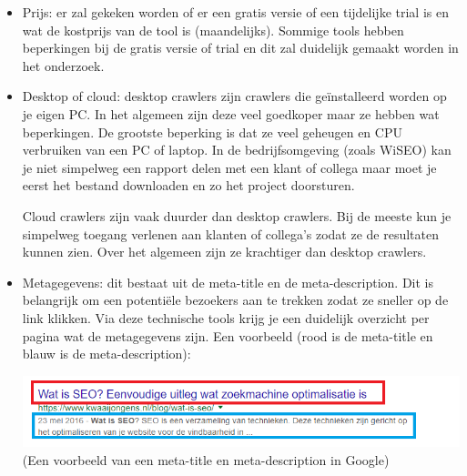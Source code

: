 \begin{itemize}
\item Prijs: er zal gekeken worden of er een gratis versie of een tijdelijke trial is en wat de kostprijs van de tool is (maandelijks). Sommige tools hebben beperkingen bij de gratis versie of trial en dit zal duidelijk gemaakt worden in het onderzoek. 
\item Desktop of cloud: 
desktop crawlers zijn crawlers die geïnstalleerd worden op je eigen PC. In het algemeen zijn deze veel goedkoper maar ze hebben wat beperkingen. De grootste beperking is dat ze veel geheugen en CPU verbruiken van een PC of laptop. In de bedrijfsomgeving (zoals WiSEO) kan je niet simpelweg een rapport delen met een klant of collega maar moet je eerst het bestand downloaden en zo het project doorsturen. 

Cloud crawlers zijn vaak duurder dan desktop crawlers. Bij de meeste kun je simpelweg toegang verlenen aan klanten of collega’s zodat ze de resultaten kunnen zien. Over het algemeen zijn ze krachtiger dan desktop crawlers. 

\item Metagegevens: dit bestaat uit de meta-title en de meta-description. Dit is belangrijk om een potentiële bezoekers aan te trekken zodat ze sneller op de link klikken. Via deze technische tools krijg je een duidelijk overzicht per pagina wat de metagegevens zijn. Een voorbeeld (rood is de meta-title en blauw is de meta-description):

\includegraphics[width=\linewidth]{Bachelorproef/bachelor/img/metadescription.png}
(Een voorbeeld van een meta-title en meta-description in Google)


\end{itemize}

